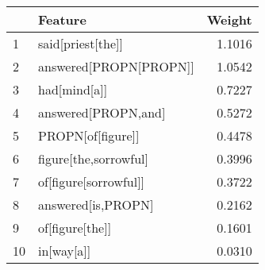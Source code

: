 \begin{tabular}{llr}
\toprule
{} &                 Feature &  Weight \\
\midrule
1  &       said[priest[the]] &  1.1016 \\
2  &  answered[PROPN[PROPN]] &  1.0542 \\
3  &            had[mind[a]] &  0.7227 \\
4  &     answered[PROPN,and] &  0.5272 \\
5  &       PROPN[of[figure]] &  0.4478 \\
6  &   figure[the,sorrowful] &  0.3996 \\
7  &   of[figure[sorrowful]] &  0.3722 \\
8  &      answered[is,PROPN] &  0.2162 \\
9  &         of[figure[the]] &  0.1601 \\
10 &              in[way[a]] &  0.0310 \\
\bottomrule
\end{tabular}
